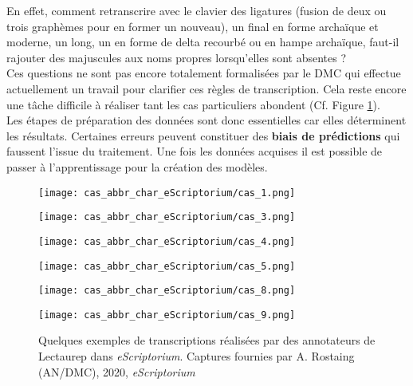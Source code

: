 En effet, comment retranscrire avec le clavier des ligatures (fusion de deux ou trois graphèmes pour en former un nouveau), un  final en forme archaïque et moderne, un  long, un  en forme de delta recourbé ou en hampe archaïque, faut-il rajouter des majuscules aux noms propres lorsqu'elles sont absentes ?\\

Ces questions ne sont pas encore totalement formalisées par le DMC qui effectue actuellement un travail pour clarifier ces règles de transcription. Cela reste encore une tâche difficile à réaliser tant les cas particuliers abondent (Cf. Figure \ref{fig:exemples_eScriptorium}).\\

Les étapes de préparation des données sont donc essentielles car elles déterminent les résultats. Certaines erreurs peuvent constituer des \textbf{biais de prédictions} qui faussent l'issue du traitement. Une fois les données acquises il est possible de passer à l'apprentissage pour la création des modèles. 

\begin{figure}[h!]
    \begin{minipage}[c]{.46\linewidth} 
        \centering
        \texttt{[image: cas\_abbr\_char\_eScriptorium/cas\_1.png]}
        \end{minipage}
    \hfill%
    \begin{minipage}[c]{.46\linewidth}
        \centering
        \texttt{[image: cas\_abbr\_char\_eScriptorium/cas\_3.png]}
    \end{minipage}
    \hfill%
    \begin{minipage}[c]{.46\linewidth}
        \centering
        \texttt{[image: cas\_abbr\_char\_eScriptorium/cas\_4.png]}
    \end{minipage}
    \hfill%
    \begin{minipage}[c]{.46\linewidth}
        \centering
        \texttt{[image: cas\_abbr\_char\_eScriptorium/cas\_5.png]}
    \end{minipage}
    \hfill%
    \begin{minipage}[c]{.46\linewidth}
        \centering
        \texttt{[image: cas\_abbr\_char\_eScriptorium/cas\_8.png]}
    \end{minipage}
    \hfill%
    \begin{minipage}[c]{.46\linewidth}
        \centering
        \texttt{[image: cas\_abbr\_char\_eScriptorium/cas\_9.png]}
    \end{minipage}
        \caption{Quelques exemples de transcriptions réalisées par des annotateurs de Lectaurep dans \textit{eScriptorium}. \textcopyright Captures fournies par A. Rostaing (AN/DMC), 2020, \textit{eScriptorium}}
    \label{fig:exemples_eScriptorium}
\end{figure}
\newpage

